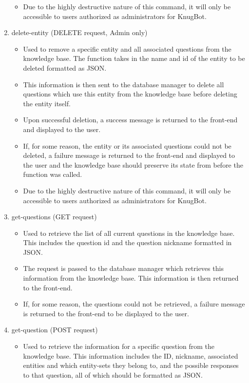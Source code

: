 \documentclass[titlepage, 12pt]{article}
\begin{document}
\begin{enumerate}
\begin{itemize}
        \item Due to the highly destructive nature of this command, it will only be accessible to users authorized as administrators for KnugBot.
    \end{itemize}
    \item delete-entity (DELETE request, Admin only)
    \begin{itemize}
        \item Used to remove a specific entity and all associated questions from the knowledge base. The function takes in the name and id of the entity to be deleted formatted as JSON.
        \item This information is then sent to the database manager to delete all questions which use this entity from the knowledge base before deleting the entity itself.
        \item Upon successful deletion, a success message is returned to the front-end and displayed to the user.
        \item If, for some reason, the entity or its associated questions could not be deleted, a failure message is returned to the front-end and displayed to the user and the knowledge base should preserve its state from before the function was called.
        \item Due to the highly destructive nature of this command, it will only be accessible to users authorized as administrators for KnugBot.
    \end{itemize}
    \item get-questions (GET request)
    \begin{itemize}
        \item Used to retrieve the list of all current questions in the knowledge base. This includes the question id and the question nickname formatted in JSON.
        \item The request is passed to the database manager which retrieves this information from the knowledge base. This information is then returned to the front-end.
        \item If, for some reason, the questions could not be retrieved, a failure message is returned to the front-end to be displayed to the user.
    \end{itemize}
    \item get-question (POST request)
    \begin{itemize}
        \item Used to retrieve the information for a specific question from the knowledge base. This information includes the ID, nickname, associated entities and which entity-sets they belong to, and the possible responses to that question, all of which should be formatted as JSON.

\end{itemize}
\end{enumerate}
\end{document}

